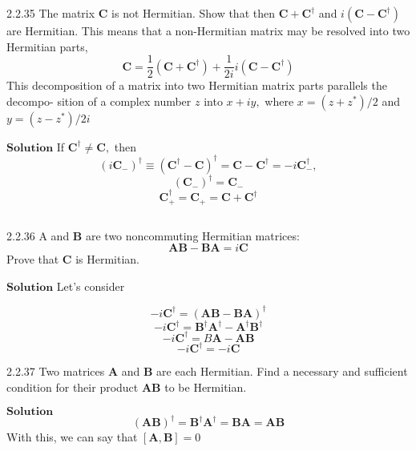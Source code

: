 $$$$

\begin{mybox}{2.2.35}
The matrix $\mathbf{C}$ is not Hermitian. Show that then $\mathbf{C}+\mathbf{C}^{\dagger}$ and $i\left(\mathbf{C}-\mathbf{C}^{\dagger}\right)$ are Hermitian.
This means that a non-Hermitian matrix may be resolved into two Hermitian parts,
$$
\mathbf{C}=\frac{1}{2}\left(\mathbf{C}+\mathbf{C}^{\dagger}\right)+\frac{1}{2 i} i\left(\mathbf{C}-\mathbf{C}^{\dagger}\right)
$$
This decomposition of a matrix into two Hermitian matrix parts parallels the decompo-
sition of a complex number $z$ into $x+i y,$ where $x=\left(z+z^{*}\right) / 2$ and $y=\left(z-z^{*}\right) / 2 i$
\end{mybox}


$\boxed{\textbf{Solution}}$ If $\mathbf{C}^{\dagger} \neq \mathbf{C},$ then 
$$\left(i \mathbf{C}_{-}\right)^{\dagger} \equiv\left(\mathbf{C}^{\dagger}-\mathbf{C}\right)^{\dagger}=\mathbf{C}-\mathbf{C}^{\dagger}=-i \mathbf{C}_{-}^{\dagger},$$
$$\left(\mathbf{C}_{-}\right)^{\dagger}=\mathbf{C}_{-}$$
$$\mathbf{C}_{+}^{\dagger}=\mathbf{C}_{+}=\mathbf{C}+\mathbf{C}^{\dagger}$$

$$$$

\begin{mybox}{2.2.36}
A and $\mathbf{B}$ are two noncommuting Hermitian matrices:
$$
\mathbf{AB}-\mathbf{B}\mathbf{A}=i \mathbf{C}
$$
Prove that $\mathbf{C}$ is Hermitian.
\end{mybox}


$\boxed{\textbf{Solution}}$ Let's consider

$$-i \mathbf{C}^{\dagger}=(\mathbf{A}\mathbf{B}-\mathbf{B}\mathbf{A})^{\dagger}$$
$$-i \mathbf{C}^{\dagger}=\mathbf{B}^{\dagger} \mathbf{A}^{\dagger}-\mathbf{A}^{\dagger} \mathbf{B}^{\dagger}$$
$$-i \mathbf{C}^{\dagger}=B \mathbf{A}-\mathbf{A}\mathbf{B}$$
$$-i \mathbf{C}^{\dagger}=-i \mathbf{C}$$

\newpage

\begin{mybox}{2.2.37}
Two matrices $\mathbf{A}$ and $\mathbf{B}$ are each Hermitian. Find a necessary and sufficient condition for
their product $\mathbf{AB}$ to be Hermitian.
\end{mybox}


$\boxed{\textbf{Solution}}$ 
$$(\mathbf{A}\mathbf{B})^{\dagger}=\mathbf{B}^{\dagger} \mathbf{A}^{\dagger}=\mathbf{B} \mathbf{A}=\mathbf{AB}$$
With this, we can say that $[\mathbf{A}, \mathbf{B}] = 0$

$$$$

